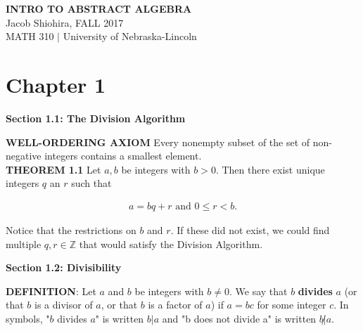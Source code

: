 \documentclass[12pt]{article}
\newcommand{\Z}{\mathbb{Z}}
\begin{document}
 
\begin{center}
\textbf{INTRO TO ABSTRACT ALGEBRA} \\
Jacob Shiohira, FALL 2017 \\
MATH 310 $|$ University of Nebraska-Lincoln
\end{center} 

\section*{Chapter 1}

\begin{center}
\textbf{Section 1.1: The Division Algorithm} \\
\end{center}

\noindent
\textbf{WELL-ORDERING AXIOM} Every nonempty subset of the set of non-negative integers contains a smallest element. \\

\noindent
\textbf{THEOREM 1.1} Let $a,b$ be integers with $b>0$. Then there exist unique integers $q$ an $r$ such that

\begin{align*}
a=bq+r \text{     and     } 0 \leq r < b.
\end{align*}

\noindent
Notice that the restrictions on $b$ and $r$. If these did not exist, we could find multiple $q,r \in \Z$ that would satisfy the Division Algorithm.

\begin{center}
\textbf{Section 1.2: Divisibility} \\
\end{center}

\noindent
\textbf{DEFINITION}: Let $a$ and $b$ be integers with $b \neq 0$. We say that $b$ \textbf{divides} $a$ (or that $b$ is a divisor of $a$, or that $b$ is a factor of $a$) if $a=bc$ for some integer $c$. In symbols, "$b$ divides $a$" is written $b|a$ and "b does not divide a" is written $b \not | a$. \\
\end{document}
